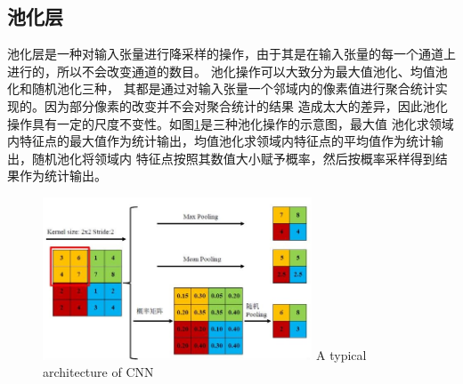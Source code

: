 \subsection{池化层}
	池化层是一种对输入张量进行降采样的操作，由于其是在输入张量的每一个通道上进行的，所以不会改变通道的数目。
	池化操作可以大致分为最大值池化、均值池化和随机池化三种，
	其都是通过对输入张量一个邻域内的像素值进行聚合统计实现的。因为部分像素的改变并不会对聚合统计的结果
	造成太大的差异，因此池化操作具有一定的尺度不变性。如图\ref{fig:pooling}是三种池化操作的示意图，最大值
	池化求领域内特征点的最大值作为统计输出，均值池化求领域内特征点的平均值作为统计输出，随机池化将领域内
	特征点按照其数值大小赋予概率，然后按概率采样得到结果作为统计输出。
	\begin{figure}[h]
	  \centering
	  \includegraphics[width=8cm]{figure/chap4/pooling.jpg}
		{A typical architecture of CNN}
	  \label{fig:pooling}
	\end{figure}
